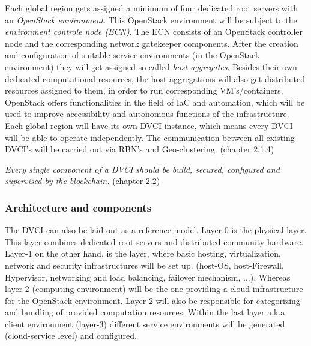 \documentclass[]{article}
\begin{document}
Each global region gets assigned a minimum of four dedicated root servers with an \textit{OpenStack environment}.
This OpenStack environment will be subject to the \textit{environment controle node (ECN)}.
The ECN consists of an OpenStack controller node and the corresponding network gatekeeper components. 
After the creation and configuration of suitable service environments (in the OpenStack environment) they will get assigned so called \textit{host aggregates}. 
Besides their own dedicated computational resources, the host aggregations will also get distributed resources assigned to them, in order to run corresponding VM's/containers.
OpenStack offers functionalities in the field of IaC and automation, which will be used to improve accessibility and autonomous functions of the infrastructure.
Each global region will have its own DVCI instance, which means every DVCI will be able to operate independently.
The communication between all existing DVCI's will be carried out via RBN's and Geo-clustering. (chapter 2.1.4)

\textit{Every single component of a DVCI should be build, secured, configured and supervised by the blockchain.} (chapter 2.2)

\subsubsection{Architecture and components}
The DVCI can also be laid-out as a reference model.
Layer-0 is the physical layer.
This layer combines dedicated root servers and distributed community hardware. 
Layer-1 on the other hand, is the layer, where basic hosting, virtualization, network and security infrastructures will be set up. (host-OS, host-Firewall, Hypervisor, networking and load balancing, failover mechanism, ...).
Whereas layer-2 (computing environment) will be the one providing a cloud infrastructure for the OpenStack environment.
Layer-2 will also be responsible for categorizing and bundling of provided computation resources.
Within the last layer a.k.a client environment (layer-3) different service environments will be generated (cloud-service level) and configured.
\end{document}
